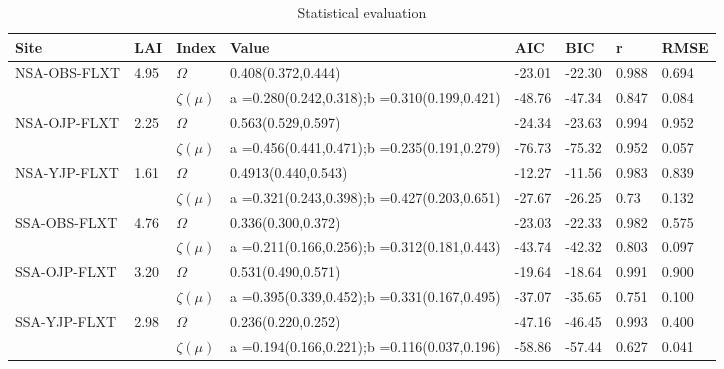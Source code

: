 \begin{sidewaystable}
\caption{Statistical evaluation}
\begin{tabular}{p{4.0cm} p{2.1cm} p{1.5cm} p{4.1cm} p{2.1cm} p{2.1cm} p{2.1cm} p{2.1cm}}
\hline
\hline   
\bf Site & \bf LAI &  \bf Index & \bf Value & \bf AIC & \bf BIC & \bf r &  \bf RMSE\\
 \hline
\multirow{2}{*}{NSA-OBS-FLXT} 
     & 4.95  &  \bf $\Omega$         &  0.408(0.372,0.444) & -23.01 &	-22.30	& 0.988 &	0.694\\
     &       &  \bf $\zeta(\mu)$     &  a =0.280(0.242,0.318);\newline b =0.310(0.199,0.421) & -48.76 & -47.34 & 0.847 & 0.084\\
\multirow{2}{*}{NSA-OJP-FLXT} 
     & 2.25  &  \bf $\Omega$     &  0.563(0.529,0.597) & -24.34	& -23.63 & 0.994 & 0.952\\
     &       &  \bf $\zeta(\mu)$ &  a =0.456(0.441,0.471);\newline b =0.235(0.191,0.279) & -76.73 &	-75.32	& 0.952 &	0.057\\
\multirow{2}{*}{NSA-YJP-FLXT} 
     & 1.61 &  \bf $\Omega$         &  0.4913(0.440,0.543) & -12.27 &	-11.56 &	0.983	& 0.839\\
     & &  \bf $\zeta(\mu)$          &  a =0.321(0.243,0.398);\newline b =0.427(0.203,0.651) & -27.67 &	-26.25	& 0.73 &	0.132\\
\multirow{2}{*}{SSA-OBS-FLXT} 
     & 4.76 &  \bf $\Omega$         &  0.336(0.300,0.372) & -23.03 & -22.33 & 0.982 & 0.575\\
     & &  \bf $\zeta(\mu)$          &  a =0.211(0.166,0.256);\newline b =0.312(0.181,0.443) & -43.74	& -42.32 & 0.803 & 0.097
\\
\multirow{2}{*}{SSA-OJP-FLXT} 
     & 3.20 &  \bf $\Omega$         &  0.531(0.490,0.571) & -19.64 & -18.64 & 0.991 & 0.900\\
    &  &  \bf $\zeta(\mu)$          &  a =0.395(0.339,0.452);\newline b =0.331(0.167,0.495) & -37.07 & -35.65 & 0.751 & 0.100\\
\multirow{2}{*}{SSA-YJP-FLXT} 
     & 2.98 &  \bf $\Omega$         &  0.236(0.220,0.252) & -47.16 & -46.45 & 0.993 & 0.400\\
    &  &  \bf $\zeta(\mu)$          &  a =0.194(0.166,0.221);\newline b =0.116(0.037,0.196) & -58.86 & -57.44 & 0.627 & 0.041\\

\end{tabular}
\end{sidewaystable}
